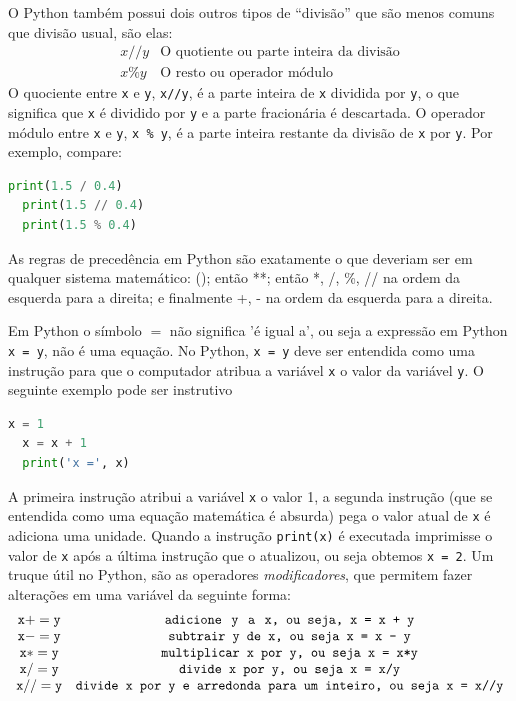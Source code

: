 O Python também possui dois outros tipos de ``divisão'' que são menos comuns que divisão usual, são elas:
\[ \begin{array}{cc}
    x // y & \textrm{O quotiente ou parte inteira da divisão} \\
    x \% y & \textrm{O resto ou operador módulo}
\end{array} \]
O quociente entre {\tt x} e {\tt y}, {\tt x//y},  é a parte inteira de {\tt x} dividida por {\tt y}, o que significa que {\tt x} é dividido por {\tt y} e a parte fracionária é descartada. O operador módulo entre {\tt x} e {\tt y}, {\tt x \% y}, é a parte inteira restante da divisão de {\tt x} por {\tt y}. Por exemplo, compare:
\begin{lstlisting}[language=Python]
  print(1.5 / 0.4)
  print(1.5 // 0.4)
  print(1.5 % 0.4)
\end{lstlisting}

As regras de precedência em Python são exatamente o que deveriam ser em qualquer
sistema matemático: (); então **; então *, /, \%, // na ordem da esquerda para a direita; e
finalmente +, - na ordem da esquerda para a direita.

Em Python o símbolo $=$ não significa 'é igual a', ou seja a expressão em Python {\tt x = y}, não é uma equação. No Python,  {\tt x = y} deve ser entendida como uma instrução para que o computador atribua a variável {\tt x} o valor da variável {\tt y}. O seguinte exemplo pode ser instrutivo
\begin{lstlisting}[language=Python]
  x = 1
  x = x + 1
  print('x =', x)
\end{lstlisting}
A primeira instrução atribui a variável {\tt x} o valor 1, a segunda instrução (que se entendida como uma equação matemática é absurda) pega o valor atual de {\tt x} é adiciona uma unidade. Quando a instrução {\tt print(x)} é executada imprimisse o valor de {\tt x} após a última instrução que o atualizou, ou seja obtemos {\tt x = 2}. Um truque  útil no Python, são as operadores {\it modificadores}, que permitem fazer alterações em uma variável da seguinte forma:
\[\begin{array}{cc}
{\tt x += y} & \text{\tt adicione\, y\, a\, x, ou seja, x = x + y}\\
{\tt x -= y} & \text{\tt subtrair y de x, ou seja x = x - y}\\
{\tt x *= y} & \text{\tt multiplicar x por y, ou seja x = x*y}\\
{\tt x /= y} & \text{\tt divide x por y, ou seja x = x/y}\\
{\tt x //= y} & \text{\tt divide x por y e arredonda para um inteiro, ou seja x = x//y}
\end{array}\]

